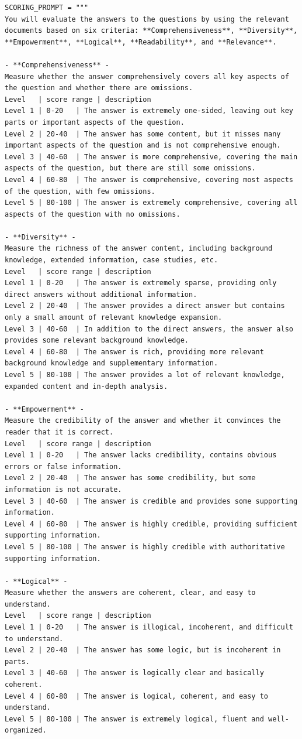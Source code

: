 \documentclass[a4paper,fleqn]{cas-dc}
\begin{document}
\begin{lstlisting}
SCORING_PROMPT = """
You will evaluate the answers to the questions by using the relevant documents based on six criteria: **Comprehensiveness**, **Diversity**, **Empowerment**, **Logical**, **Readability**, and **Relevance**.

- **Comprehensiveness** -
Measure whether the answer comprehensively covers all key aspects of the question and whether there are omissions.
Level   | score range | description
Level 1 | 0-20   | The answer is extremely one-sided, leaving out key parts or important aspects of the question.
Level 2 | 20-40  | The answer has some content, but it misses many important aspects of the question and is not comprehensive enough.
Level 3 | 40-60  | The answer is more comprehensive, covering the main aspects of the question, but there are still some omissions.
Level 4 | 60-80  | The answer is comprehensive, covering most aspects of the question, with few omissions.
Level 5 | 80-100 | The answer is extremely comprehensive, covering all aspects of the question with no omissions.

- **Diversity** -
Measure the richness of the answer content, including background knowledge, extended information, case studies, etc.
Level   | score range | description
Level 1 | 0-20   | The answer is extremely sparse, providing only direct answers without additional information.
Level 2 | 20-40  | The answer provides a direct answer but contains only a small amount of relevant knowledge expansion.
Level 3 | 40-60  | In addition to the direct answers, the answer also provides some relevant background knowledge.
Level 4 | 60-80  | The answer is rich, providing more relevant background knowledge and supplementary information.
Level 5 | 80-100 | The answer provides a lot of relevant knowledge, expanded content and in-depth analysis.

- **Empowerment** -
Measure the credibility of the answer and whether it convinces the reader that it is correct.
Level   | score range | description
Level 1 | 0-20   | The answer lacks credibility, contains obvious errors or false information.
Level 2 | 20-40  | The answer has some credibility, but some information is not accurate.
Level 3 | 40-60  | The answer is credible and provides some supporting information.
Level 4 | 60-80  | The answer is highly credible, providing sufficient supporting information.
Level 5 | 80-100 | The answer is highly credible with authoritative supporting information.

- **Logical** -
Measure whether the answers are coherent, clear, and easy to understand.
Level   | score range | description
Level 1 | 0-20   | The answer is illogical, incoherent, and difficult to understand.
Level 2 | 20-40  | The answer has some logic, but is incoherent in parts.
Level 3 | 40-60  | The answer is logically clear and basically coherent.
Level 4 | 60-80  | The answer is logical, coherent, and easy to understand.
Level 5 | 80-100 | The answer is extremely logical, fluent and well-organized.


\end{lstlisting}
\end{document}
